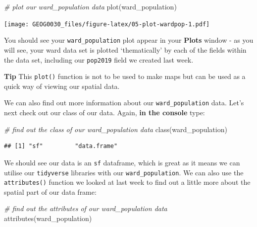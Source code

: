 \documentclass[
]{book}
\newenvironment{Shaded}{\begin{snugshade}}{\end{snugshade}}
\newcommand{\CommentTok}[1]{\textcolor[rgb]{0.56,0.35,0.01}{\textit{#1}}}
\newcommand{\FunctionTok}[1]{\textcolor[rgb]{0.00,0.00,0.00}{#1}}
\newcommand{\NormalTok}[1]{#1}
\begin{document}
\begin{Shaded}
\begin{Highlighting}[]
\CommentTok{\# plot our ward\_population data}
\FunctionTok{plot}\NormalTok{(ward\_population)}
\end{Highlighting}
\end{Shaded}

\texttt{[image: GEOG0030\_files/figure-latex/05-plot-wardpop-1.pdf]}

You should see your \texttt{ward\_population} plot appear in your \textbf{Plots} window - as you will see, your ward data set is plotted `thematically' by each of the fields within the data set, including our \texttt{pop2019} field we created last week.

\textbf{Tip}
This \texttt{plot()} function is not to be used to make maps but can be used as a quick way of viewing our spatial data.

We can also find out more information about our \texttt{ward\_population} data. Let's next check out our class of our data. Again, \textbf{in the console} type:

\begin{Shaded}
\begin{Highlighting}[]
\CommentTok{\# find out the class of our ward\_population data}
\FunctionTok{class}\NormalTok{(ward\_population)}
\end{Highlighting}
\end{Shaded}

\begin{verbatim}
## [1] "sf"         "data.frame"
\end{verbatim}

We should see our data is an \texttt{sf} dataframe, which is great as it means we can utilise our \texttt{tidyverse} libraries with our \texttt{ward\_population}. We can also use the \texttt{attributes()} function we looked at last week to find out a little more about the spatial part of our data frame:

\begin{Shaded}
\begin{Highlighting}[]
\CommentTok{\# find out the attributes of our ward\_population data}
\FunctionTok{attributes}\NormalTok{(ward\_population)}
\end{Highlighting}
\end{Shaded}
\end{document}

